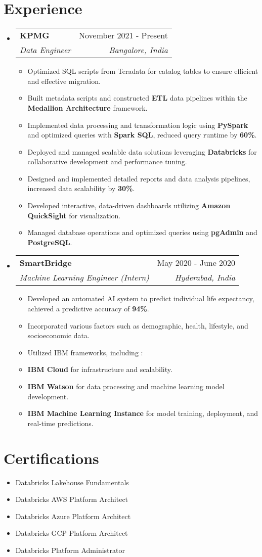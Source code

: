 \documentclass[letterpaper,11pt]{article}
\makeatletter
\newcommand{\resumeItem}[1]{
  \item\small{
    {#1 \vspace{-2pt}}
  }
}
\newcommand{\resumeSubheading}[4]{
  \vspace{-2pt}\item
    \begin{tabular*}{0.97\textwidth}[t]{l@{\extracolsep{\fill}}r}
      \textbf{#1} & #2 \\
      \textit{\small#3} & \textit{\small #4} \\
    \end{tabular*}\vspace{-7pt}
}
\newcommand{\resumeSubHeadingListStart}{\begin{itemize}[leftmargin=0.15in, label={}]}
\newcommand{\resumeSubHeadingListEnd}{\end{itemize}}
\newcommand{\resumeItemListStart}{\begin{itemize}}
\newcommand{\resumeItemListEnd}{\end{itemize}\vspace{-5pt}}
\makeatother
\begin{document}
\section{Experience}
  \resumeSubHeadingListStart
    \resumeSubheading
      {KPMG}{November 2021 - Present}
      {Data Engineer}{Bangalore, India}
      \resumeItemListStart
      \resumeItem{Optimized SQL scripts from Teradata for catalog tables to ensure efficient and effective migration.}
      \resumeItem{Built metadata scripts and constructed \textbf{ETL} data pipelines within the \textbf{Medallion Architecture} framework.}
      \resumeItem{Implemented data processing and transformation logic using \textbf{PySpark} and optimized queries with \textbf{Spark SQL}, reduced query runtime by \textbf{60\%}.}
      \resumeItem{Deployed and managed scalable data solutions leveraging \textbf{Databricks} for collaborative development and performance tuning.}
      \resumeItemListEnd

      \resumeItemListStart
      \resumeItem{Designed and implemented detailed reports and data analysis pipelines, increased data scalability by \textbf{30\%}.}
      \resumeItem{Developed interactive, data-driven dashboards utilizing \textbf{Amazon QuickSight} for visualization.}
      \resumeItem {Managed database operations and optimized queries using \textbf{pgAdmin} and \textbf{PostgreSQL}.}
      \resumeItemListEnd

    \resumeSubheading
      {SmartBridge}{May 2020 - June 2020}
      {Machine Learning Engineer (Intern)}{Hyderabad, India}
      \resumeItemListStart
      \resumeItem {Developed an automated AI system to predict individual life expectancy, achieved a predictive accuracy of \textbf{94\%}.}
      \resumeItem {Incorporated various factors such as demographic, health, lifestyle, and socioeconomic data.}
      \resumeItem {Utilized IBM frameworks, including :}
      \resumeItem{\textbf{IBM Cloud} for infrastructure and scalability.}
      \resumeItem{\textbf{IBM Watson} for data processing and machine learning model development.}
      \resumeItem{\textbf{IBM Machine Learning Instance} for model training, deployment, and real-time predictions.}
      \resumeItemListEnd
  \resumeSubHeadingListEnd

\section{Certifications}
    \resumeItemListStart
    \resumeItem {Databricks Lakehouse Fundamentals}
    \resumeItem {Databricks AWS Platform Architect}
    \resumeItem {Databricks Azure Platform Architect}
    \resumeItem {Databricks GCP Platform Architect}
    \resumeItem {Databricks Platform Administrator}
    \resumeSubHeadingListEnd
\end{document}
